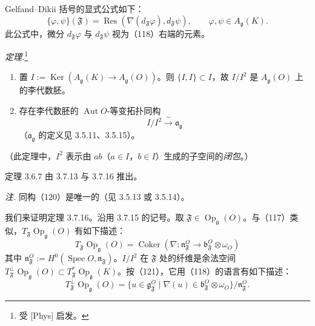 
Gelfand--Dikii 括号的显式公式如下：
\begin{equation}\tag{119}
\{\varphi,\psi\}(\mathfrak{F})=\operatorname{Res}(\nabla(d_{\mathfrak{F}}\varphi),d_{\mathfrak{F}}\psi),\qquad \varphi,\psi\in A_{\mathfrak{g}}(K).
\end{equation}
此公式中，微分 $d_{\mathfrak{F}}\varphi$ 与 $d_{\mathfrak{F}}\psi$ 视为（118）右端的元素。

 \emph{定理.}\footnote{受 [Phys] 启发。}
\begin{enumerate}[label=(\roman*),leftmargin=2.2em]
\item 置 $I:=\operatorname{Ker}(A_{\mathfrak{g}}(K)\to A_{\mathfrak{g}}(O))$。则 $\{I,I\}\subset I$，故 $I/I^2$ 是 $A_{\mathfrak{g}}(O)$ 上的李代数胚。
\item 存在李代数胚的 $\operatorname{Aut}O$-等变拓扑同构
\begin{equation}\tag{120}
I/I^2\xrightarrow{\ \sim\ }\mathfrak{a}_{\mathfrak{g}}
\end{equation}
（$\mathfrak{a}_{\mathfrak{g}}$ 的定义见 3.5.11、3.5.15）。
\end{enumerate}
（此定理中，$I^2$ 表示由 $ab$（$a\in I$，$b\in I$）生成的子空间的\emph{闭包}。）

定理 3.6.7 由 3.7.13 与 3.7.16 推出。

\emph{注.} 同构（120）是唯一的（见 3.5.13 或 3.5.14）。

 我们来证明定理 3.7.16。沿用 3.7.15 的记号。取 $\mathfrak{F}\in\operatorname{Op}_{\mathfrak{g}}(O)$。与（117）类似，$T_{\mathfrak{F}}\operatorname{Op}_{\mathfrak{g}}(O)$ 有如下描述：
\begin{equation}\tag{121}
T_{\mathfrak{F}}\operatorname{Op}_{\mathfrak{g}}(O)=\operatorname{Coker}(\nabla:\mathfrak{n}^O_{\mathfrak{F}}\to\mathfrak{b}^O_{\mathfrak{F}}\otimes\omega_O)
\end{equation}
其中 $\mathfrak{n}^O_{\mathfrak{F}}:=H^0(\operatorname{Spec}O,\mathfrak{n}_{\mathfrak{F}})$。$I/I^2$ 在 $\mathfrak{F}$ 处的纤维是余法空间 $T^{\perp}_{\mathfrak{F}}\operatorname{Op}_{\mathfrak{g}}(O)\subset T^*_{\mathfrak{F}}\operatorname{Op}_{\mathfrak{g}}(K)$。按（121），它用（118）的语言有如下描述：
\begin{equation}\tag{122}
T^{\perp}_{\mathfrak{F}}\operatorname{Op}_{\mathfrak{g}}(O)=\{u\in\mathfrak{g}^O_{\mathfrak{F}}\mid\nabla(u)\in\mathfrak{b}^O_{\mathfrak{F}}\otimes\omega_O\}/\mathfrak{n}^O_{\mathfrak{F}}.
\end{equation}

